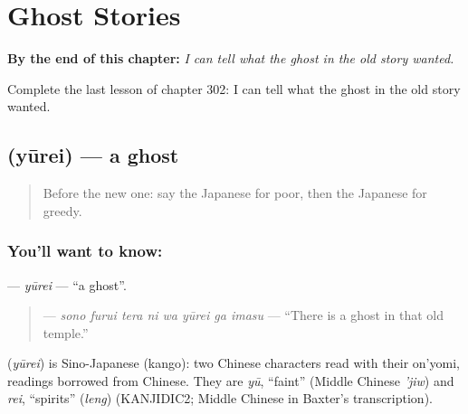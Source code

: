 
\chapter{Ghost Stories}
\label{ch:ja-ghost-stories}

\begin{chapteropening}
\textbf{By the end of this chapter:} \emph{I can tell what the ghost in the old story wanted.}

Complete the last lesson of chapter 302: I can tell what the ghost in the old story wanted.
\end{chapteropening}

\section[\texorpdfstring{\ja{ゆうれい} (yūrei)}{ゆうれい (yūrei)}]{ (yūrei) — a ghost}

\label{lesson:JA-C302-yuurei}



\begin{quote}
Before the new one: say the Japanese for poor, then the Japanese for greedy.
\end{quote}

\subsection*{You'll want to know: }
\textbf{} — \emph{yūrei} — \textquotedblleft{}a ghost\textquotedblright{}.

\begin{quote}
\textbf{    } — \emph{sono furui tera ni wa yūrei ga imasu} — \textquotedblleft{}There is a ghost in that old temple.\textquotedblright{}
\end{quote}

\begin{cousinweb}
\textbf{} (\emph{yūrei}) is Sino-Japanese (kango): two Chinese characters read with their on'yomi, readings borrowed from Chinese. They are \emph{yū}, \textquotedblleft{}faint\textquotedblright{} (Middle Chinese \emph{'jiw}) and \emph{rei}, \textquotedblleft{}spirits\textquotedblright{} (\emph{leng}) (KANJIDIC2; Middle Chinese in Baxter's transcription).
\end{cousinweb}

